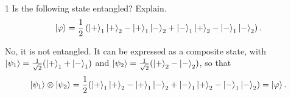 \documentclass[11pt]{article}
\begin{document}
\begin{problem}{1}
  Is the following state entangled? Explain.
  \begin{equation}
    \label{eq:p1-state}
    \ket{\varphi} = \frac{1}{2}\left(
      \ket{+}_1\ket{+}_2 - \ket{+}_1\ket{-}_2
      + \ket{-}_1\ket{+}_2 - \ket{-}_1\ket{-}_2
    \right).
  \end{equation}
\end{problem}
\begin{answer}
  No, it is not entangled.
  It can be expressed as a composite state, with \( \ket{\psi_1} = \frac{1}{\sqrt{2}}(\ket{+}_1 + \ket{-}_{1}) \) and \( \ket{\psi_2} = \frac{1}{\sqrt{2}}(\ket{+}_2 - \ket{-}_{2}) \), so that
  \begin{equation}
  \label{eq:1}
  \ket{\psi_{1}} \otimes \ket{\psi_{2}} = \frac{1}{2} (\ket{+}_1\ket{+}_2 - \ket{+}_1\ket{-}_2 + \ket{-}_1\ket{+}_2 - \ket{-}_1\ket{-}_2) = \ket{\varphi}.
  \end{equation}
\end{answer}
\end{document}
